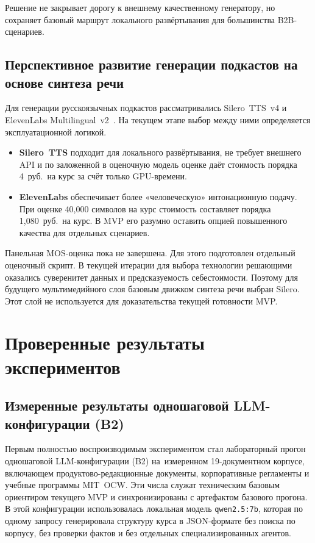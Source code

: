 Решение не закрывает дорогу к внешнему качественному генератору,
но сохраняет базовый маршрут локального развёртывания для большинства
B2B-сценариев.

\subsection[Перспективное развитие генерации подкастов]{Перспективное развитие генерации подкастов на основе синтеза речи}

Для генерации русскоязычных подкастов рассматривались Silero~TTS~v4
и ElevenLabs Multilingual~v2~\cite{silero_tts_2024, elevenlabs_2024}.
На текущем этапе выбор между ними определяется эксплуатационной логикой.

\begin{itemize}
  \item \textbf{Silero~TTS} подходит для локального развёртывания,
    не требует внешнего API и по заложенной в оценочную модель
    оценке даёт стоимость порядка 4~руб.\ на курс за счёт только
    GPU-времени.
  \item \textbf{ElevenLabs} обеспечивает более «человеческую»
    интонационную подачу. При оценке 40{,}000 символов на курс
    стоимость составляет порядка 1{,}080~руб.\ на курс. В MVP его
    разумно оставить опцией повышенного качества для отдельных сценариев.
\end{itemize}

Панельная MOS-оценка пока не завершена. Для этого подготовлен
отдельный оценочный скрипт. В текущей итерации для выбора
технологии решающими оказались суверенитет данных и предсказуемость
себестоимости. Поэтому для будущего мультимедийного слоя базовым
движком синтеза речи выбран Silero. Этот слой не используется для
доказательства текущей готовности MVP.

\section{Проверенные результаты экспериментов}
\label{sec:exp-results}

\subsection[Результаты одношаговой LLM-конфигурации (B2)]{Измеренные результаты одношаговой LLM-конфигурации (B2)}

Первым полностью воспроизводимым экспериментом стал лабораторный прогон
одношаговой LLM-конфигурации (B2) на~измеренном 19-документном корпусе,
включающем продуктово-редакционные документы, корпоративные регламенты и учебные
программы MIT~OCW. Эти числа служат техническим базовым ориентиром
текущего MVP и синхронизированы с артефактом базового прогона.
В этой конфигурации использовалась локальная модель \texttt{qwen2.5:7b},
которая по одному запросу генерировала структуру курса в JSON-формате
без поиска по корпусу, без проверки фактов и без отдельных специализированных
агентов.

